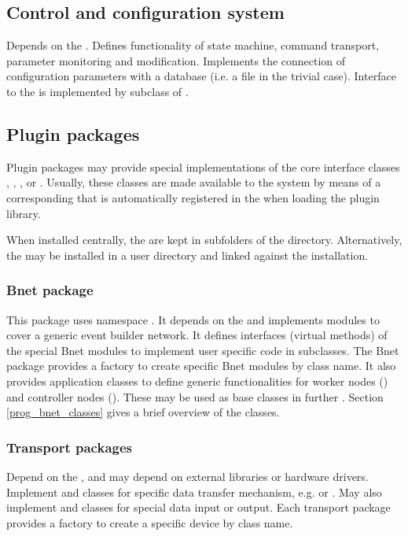 \subsection{Control and configuration system}
   Depends on the . Defines 
   functionality of state machine, command transport, parameter 
   monitoring and modification. Implements the 
   connection of configuration parameters with a database 
   (i.e. a file in the trivial case). Interface to the  is 
   implemented by subclass of .

                
\subsection{Plugin packages}
Plugin packages may provide special implementations of the core interface classes 
, , , or
. Usually, these classes are made available to the system by means
of a corresponding  that is automatically registered in the  
when loading the plugin library.

When installed centrally, the  are kept in subfolders of the   directory.
Alternatively, the  may be installed in a user directory and linked against the
 installation.

\subsubsection{Bnet package}
   This package uses namespace . It depends on the  and implements 
   modules to cover a generic event builder network. 
   It defines interfaces (virtual methods) of the special Bnet modules to 
   implement user specific code in subclasses. The Bnet package provides a 
   factory to create specific Bnet modules by class name. It also 
   provides application classes to define generic functionalities for 
   worker nodes () and 
   controller nodes (). These may be used as base classes
   in further .
   Section \ref{prog_bnet_classes} gives a brief overview of the
 classes.   
   
\subsubsection{Transport packages}
   Depend on the , and may depend on external libraries or hardware drivers. 
   Implement  and 
    classes for specific data transfer mechanism, e.g. 
    or . May also implement  
   and  classes for special data input or output. Each transport package provides a 
   factory to create a specific device by class name. 
   
